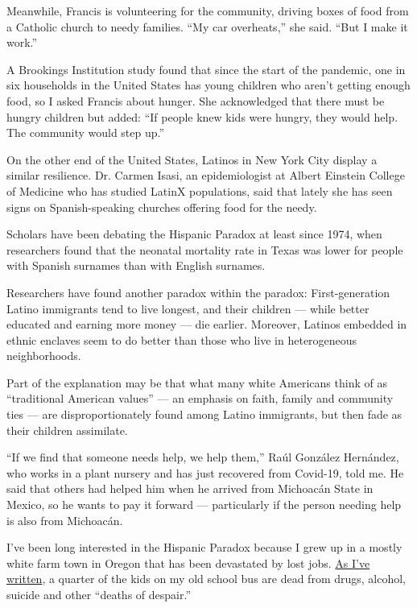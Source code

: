 Meanwhile, Francis is volunteering for the community, driving boxes of
food from a Catholic church to needy families. ``My car overheats,'' she
said. ``But I make it work.''

A Brookings Institution study found that since the start of the
pandemic, one in six households in the United States has young children
who aren't getting enough food, so I asked Francis about hunger. She
acknowledged that there must be hungry children but added: ``If people
knew kids were hungry, they would help. The community would step up.''

On the other end of the United States, Latinos in New York City display
a similar resilience. Dr. Carmen Isasi, an epidemiologist at Albert
Einstein College of Medicine who has studied LatinX populations, said
that lately she has seen signs on Spanish-speaking churches offering
food for the needy.

Scholars have been debating the Hispanic Paradox at least since 1974,
when researchers found that the neonatal mortality rate in Texas was
lower for people with Spanish surnames than with English surnames.

Researchers have found another paradox within the paradox:
First-generation Latino immigrants tend to live longest, and their
children --- while better educated and earning more money --- die
earlier. Moreover, Latinos embedded in ethnic enclaves seem to do better
than those who live in heterogeneous neighborhoods.

Part of the explanation may be that what many white Americans think of
as ``traditional American values'' --- an emphasis on faith, family and
community ties --- are disproportionately found among Latino immigrants,
but then fade as their children assimilate.

``If we find that someone needs help, we help them,'' Raúl González
Hernández, who works in a plant nursery and has just recovered from
Covid-19, told me. He said that others had helped him when he arrived
from Michoacán State in Mexico, so he wants to pay it forward ---
particularly if the person needing help is also from Michoacán.

I've been long interested in the Hispanic Paradox because I grew up in a
mostly white farm town in Oregon that has been devastated by lost jobs.
\href{https://www.nytimes.com/2020/01/09/opinion/sunday/deaths-despair-poverty.html}{As
I've written}, a quarter of the kids on my old school bus are dead from
drugs, alcohol, suicide and other ``deaths of despair.''

